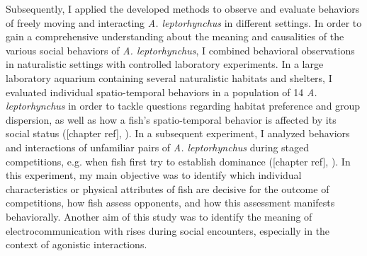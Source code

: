 \documentclass[11pt,pdftex]{article}
\newcommand{\note}[2][]{\textcolor{red!80!black}{[\textbf{\ifthenelse{\equal{#1}{}}{}{#1: }}#2]}}
\newcommand{\notetr}[1]{\note[TR]{#1}}
\newcommand{\lepto}{\textit{A. leptorhynchus}}
\begin{document}
Subsequently, I applied the developed methods to observe and evaluate behaviors of freely moving and interacting \lepto{} in different settings. In order to gain a comprehensive understanding about the meaning and causalities of the various social behaviors of \lepto{}, I combined behavioral observations in naturalistic settings with controlled laboratory experiments. In a large laboratory aquarium containing several naturalistic habitats and shelters, I evaluated individual spatio-temporal behaviors in a population of 14 \lepto{} in order to tackle questions regarding habitat preference and group dispersion, as well as how a fish's spatio-temporal behavior is affected by its social status (\notetr{chapter ref}, \citealp{Raab2019}). In a subsequent experiment, I analyzed behaviors and interactions of unfamiliar pairs of \lepto{} during staged competitions, e.g. when fish first try to establish dominance (\notetr{chapter ref}, \citealp{Raab2021}). In this experiment, my main objective was to identify which individual characteristics or physical attributes of fish are decisive for the outcome of competitions, how fish assess opponents, and how this assessment manifests behaviorally. Another aim of this study was to identify the meaning of electrocommunication with rises during social encounters, especially in the context of agonistic interactions. 




\end{document}

